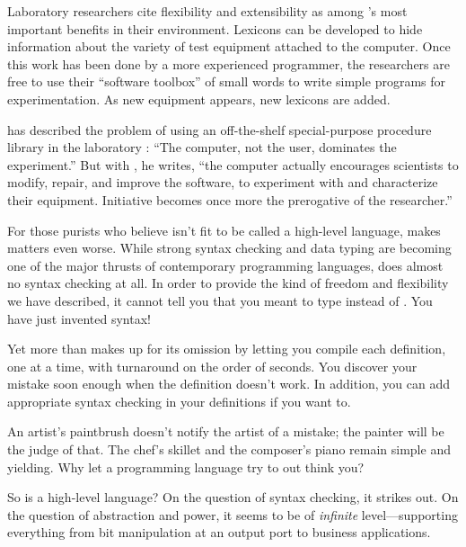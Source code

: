 Laboratory researchers cite flexibility and extensibility as among
\Forth{}'s most important benefits in their environment. Lexicons can be
developed to hide information about the variety of test equipment
attached to the computer. Once this work has been done by a more
experienced programmer, the researchers are free to use their
``software toolbox'' of small words to write simple programs for
experimentation. As new equipment appears, new lexicons are added.

 
has described the problem of using an off-the-shelf special-purpose
procedure library in the laboratory \cite{bern83}: ``The computer, not
the user, dominates the experiment.'' But with \Forth{}, he writes, ``the
computer actually encourages scientists to modify, repair, and improve
the software, to experiment with and characterize their equipment.
Initiative becomes once more the prerogative of the researcher.''%


For those purists who believe \Forth{} isn't fit to be called a
high-level language, \Forth{} makes matters even worse. While strong
syntax checking and data typing are becoming one of the major thrusts
of contemporary programming languages, \Forth{} does almost no syntax
checking at all.  In order to provide the kind of freedom and
flexibility we have described, it cannot tell you that you meant to
type  instead of . You have just
invented syntax!

Yet \Forth{} more than makes up for its omission by letting you compile
each definition, one at a time, with turnaround on the order of
seconds.  You discover your mistake soon enough when the definition
doesn't work. In addition, you can add appropriate syntax checking in
your definitions if you want to.

An artist's paintbrush doesn't notify the artist of a mistake; the
painter will be the judge of that. The chef's skillet and the
composer's piano remain simple and yielding. Why let a programming
language try to out think you?

So is \Forth{} a high-level language? On the question of syntax checking,
it strikes out. On the question of abstraction and power, it seems to
be of \emph{infinite} level---supporting everything from bit
manipulation at an output port to business applications.%
%

